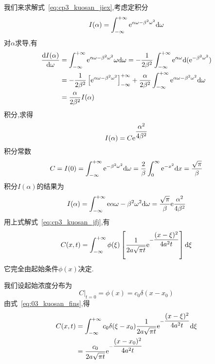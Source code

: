 我们来求解式~\eqref{eq:cp3_kuosan_jiex},考虑定积分
\begin{equation*}
 I(\alpha)=\int_{-\infty}^{+\infty}\mathrm{e}^{\alpha\omega-\beta^2\omega^2}\mathrm{d}\omega
\end{equation*}
对$\alpha$求导,有
\begin{equation*}
 \begin{aligned}
 \dfrac{\mathrm{d} I(\alpha)}{\mathrm{d}\omega} & = \int_{-\infty}^{+\infty}\mathrm{e}^{\alpha\omega-\beta^2\omega^2}\omega\mathrm{d}\omega
 =-\dfrac{1}{2\beta^2}\int_{-\infty}^{+\infty}\mathrm{e}^{\alpha\omega}\mathrm{d}(\mathrm{e}^{-\beta^2\omega^2})\\
 &=-\dfrac{1}{2\beta^2}\left[\mathrm{e}^{\alpha\omega-\beta^2\omega^2}\right]^{+\infty}_{-\infty}+\dfrac{\alpha}{2\beta^2}
 \int^{+\infty}_{-\infty}\mathrm{e}^{\alpha\omega-\beta^2\omega^2}\mathrm{d}\omega\\
 &=\dfrac{\alpha}{2\beta^2}I(\alpha)
 \end{aligned}
\end{equation*}
积分,求得
\begin{equation}
 I(\alpha)=C\mathrm{e}^{\dfrac{\alpha^2}{4\beta^2}}
\end{equation}
积分常数
\begin{equation*}
 C=I(0)=\int_{-\infty}^{+\infty}\mathrm{e}^{-\beta^2\omega^2}\mathrm{d}\omega
       =\dfrac{2}{\beta}\int_0^{\infty}\mathrm{e}^{-x^2}\mathrm{d} x=\dfrac{\sqrt{\pi}}{\beta}
\end{equation*}
积分$I(\alpha)$的结果为
\begin{equation}\label{eq:03_kuosan_gs}
 I(\alpha)=\int_{-\infty}^{+\infty}\mathrm{e}{\alpha\omega-\beta^2\omega^2}\mathrm{d}\omega
          =\dfrac{\sqrt{\pi}}{\beta}\mathrm{e}{\dfrac{\alpha^2}{4\beta^2}}
\end{equation}
用上式解式~\eqref{eq:cp3_kuosan_jfj},有
\begin{equation}\label{eq:03_kuosan_fins}
 C(x,t)=\int_{-\infty}^{+\infty}\phi(\xi)\left[\dfrac{1}{2a\sqrt{\pi t}}\mathrm{e}^{-\dfrac{(x-\xi)^2}{4a^2t}}\right]\mathrm{d}\xi
\end{equation}
它完全由起始条件$\phi(x)$决定.\par
我们设起始浓度分布为
\begin{equation*}
 \left.C\right|_{t=0}=\phi(x)=c_0\delta(x-x_0)
\end{equation*}
由式~\eqref{eq:03_kuosan_fins},得
\begin{equation}
 \begin{split}
  C(x,t)&=\int_{-\infty}^{+\infty}c_0\delta(\xi-x_0)\dfrac{1}{2a\sqrt{\pi t}}\mathrm{e}^{-\dfrac{(x-\xi)^2}{4a^2t}}\mathrm{d}\xi \\
        &=\dfrac{c_0}{2a\sqrt{\pi t}}\mathrm{e}^{-\dfrac{(x-x_0)^2}{4a^2t}}
 \end{split}
\end{equation}
